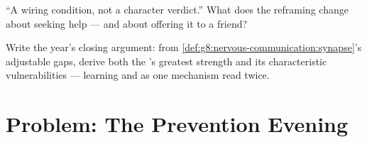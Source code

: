 \begin{exercise}[$\star\star$]\label{exo:g8:protecting-the-nervous-system:11}
``A wiring condition, not a character verdict.'' What
does the reframing change about seeking help --- and
about offering it to a friend?
\end{exercise}

\begin{exercise}[$\star\star\star$]\label{exo:g8:protecting-the-nervous-system:12}
Write the year's closing argument: from
\cref{def:g8:nervous-communication:synapse}'s adjustable
gaps, derive both the 's greatest strength and its
characteristic vulnerabilities --- learning and
 as one mechanism read twice.
\end{exercise}

\section{Problem: The Prevention Evening}

